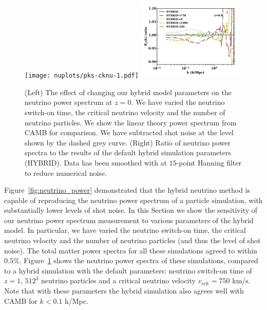 \documentclass[useAMS, usenatbib]{mnras}
\begin{document}
\begin{figure}
  \texttt{[image: nuplots/pks-cknu-1.pdf]}
  \includegraphics[width=0.45\textwidth]{nuplots/pks_nu_ckrel-1.pdf}
\caption{(Left) The effect of changing our hybrid model parameters on the neutrino power spectrum at $z=0$. We have varied the neutrino switch-on time, the critical neutrino velocity and the number of neutrino particles. We show the linear theory power spectrum from CAMB for comparison. We have subtracted shot noise at the level shown by the dashed grey curve. (Right) Ratio of neutrino power spectra to the results of the default hybrid simulation parameters (HYBRID). Data has been smoothed with at $15$-point Hanning filter to reduce numerical noise.}
  \label{fig:vcrit}
\end{figure}

Figure~\ref{fig:neutrino_power} demonstrated that the hybrid neutrino method is capable of reproducing the neutrino power spectrum of a particle simulation, with substantially lower levels of shot noise. In this Section we show the sensitivity of our neutrino power spectrum measurement to various parameters of the hybrid model. In particular, we have varied the neutrino switch-on time, the critical neutrino velocity and the number of neutrino particles (and thus the level of shot noise). The total matter power spectra for all these simulations agreed to within $0.5\%$. Figure~\ref{fig:vcrit} shows the neutrino power spectra of these simulations, compared to a hybrid simulation with the default parameters: neutrino switch-on time of $z=1$, $512^3$ neutrino particles and a critical neutrino velocity $v_\mathrm{crit} = 750$ km/s. Note that with these parameters the hybrid simulation also agrees well with CAMB for $k < 0.1$ h/Mpc.
\end{document}
